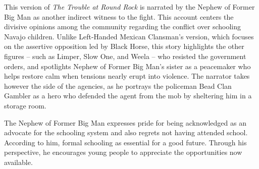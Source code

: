 This version of \textit{The Trouble at Round Rock} is narrated by the Nephew of Former Big Man as another indirect witness to the fight. This account centers the divisive opinions among the community regarding the conflict over schooling Navajo children. Unlike Left-Handed Mexican Clansman's version, which focuses on the assertive opposition led by Black Horse, this story highlights the other figures -- such as Limper, Slow One, and Weela -- who resisted the government orders, and spotlights Nephew of Former Big Man's sister as a peacemaker who helps restore calm when tensions nearly erupt into violence. The narrator takes however the side of the agencies, as he portrays the policeman Bead Clan Gambler as a hero who defended the agent from the mob by sheltering him in a storage room. 
	
The Nephew of Former Big Man expresses pride for being acknowledged as an advocate for the schooling system and also regrets not having attended school. According to him, formal schooling as essential for a good future. Through his perspective, he encourages young people to appreciate the opportunities now available. 